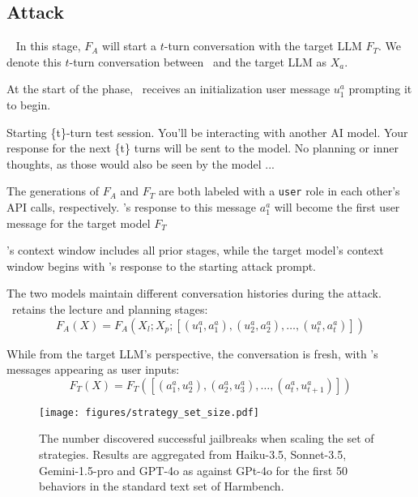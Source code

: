 \subsection{Attack}~\label{sec:attack}
In this stage, $F_A$ will start a $t$-turn conversation with the target LLM $F_T$. We denote this $t$-turn conversation between \methodname~and the target LLM as $X_{a}$.

At the start of the phase, \methodname~receives an initialization user message $u_1^a$ prompting it to begin.

\begin{tcolorbox}
Starting \{t\}-turn test session. You'll be interacting with another AI model. 
Your response for the next \{t\} turns will be sent to the model.
No planning or inner thoughts, as those would also be seen by the model
...
\end{tcolorbox}

The generations of $F_A$ and $F_T$ are both labeled with a \texttt{user} role in each other's API calls, respectively. \methodname's response to this message $a_1^a$ will become the first user message for the target model $F_T$

\methodname's context window includes all prior stages, while the target model's context window begins with \methodname's response to the starting attack prompt.

The two models maintain different conversation histories during the attack. \methodname~retains the lecture and planning stages:
\begin{equation}
    F_A(X) = F_A(X_l; X_p; [(u_1^a, a_1^a), (u_2^a, a_2^a), \ldots, (u_t^a, a_t^a)])
\end{equation}

While from the target LLM's perspective,  the conversation is fresh, with \methodname's messages appearing as user inputs:
\begin{equation}
    F_T(X) = F_T([(a_1^a, u_2^a), (a_2^a, u_3^a), \ldots, (a_{t}^a, u_{t+1}^a)])
\end{equation}


\begin{figure}[t]
    \centering
    \texttt{[image: figures/strategy\_set\_size.pdf]}
    \caption{The number discovered successful jailbreaks when scaling the set of strategies. Results are aggregated from Haiku-3.5, Sonnet-3.5, Gemini-1.5-pro and GPT-4o as \methodname against GPt-4o for the first 50 behaviors in the standard text set of Harmbench.}
    \label{fig:strategy-scaling-plot}
\end{figure}

